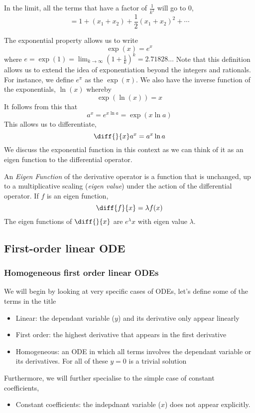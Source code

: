 \documentclass{article}
\begin{document}
In the limit, all the terms that have a factor of $\frac{1}{k^2}$ will go to $0$,
\[
    = 1 + (x_1 + x_2) + \frac{1}{2}(x_1 + x_2)^2 + \cdots
\]


The exponential property allows us to write
\[
    \exp(x) = e^x
\]
where $e = \exp(1) = \lim_{k \rightarrow \infty}(1+\frac{1}{k})^k = 2.71828\ldots$ Note that this definition allows us to extend the idea of exponentiation beyond the integers and rationals. 
For instance, we define $e^\pi$ as the $\exp(\pi)$. We also have the inverse function of the exponentials, $\ln(x)$ whereby
\[
  \exp(\ln(x)) = x  
\]
It follows from this that
\[
    a^x = e^{x \ln a} = \exp(x \ln a) 
\]
This allows us to differentiate,
\[
    \diff{}{x}a^x = a^x \ln a
\]
We discuss the exponential function in this context as we can think of it as an eigen function to the differential operator.

\begin{defi}
    An \emph{Eigen Function} of the derivative operator is a function that is unchanged, up to a multiplicative scaling (\emph{eigen value}) under the action of the differential operator. If $f$ is an eigen function,
    \[
        \diff{f}{x} = \lambda f(x)  
    \]
    The eigen functions of $\diff{}{x}$ are $e^\lambda x$ with eigen value $\lambda$.
\end{defi}

\subsection{First-order linear ODE}
\subsubsection{Homogeneous first order linear ODEs}
We will begin by looking at very specific cases of ODEs, let's define some of the terms in the title
\begin{itemize}
    \item Linear: the dependant variable ($y$) and its derivative only appear linearly
    \item First order: the highest derivative that appears in the first derivative
    \item Homogeneous: an ODE in which all terms involves the dependant variable or its derivatives. For all of these $y=0$ is a trivial solution
\end{itemize}
Furthermore, we will further specialise to the simple case of constant coefficients,\
\begin{itemize}
    \item Constant coefficients: the indepdnant variable ($x$) does not appear explicitly.
\end{itemize}
\end{document}
